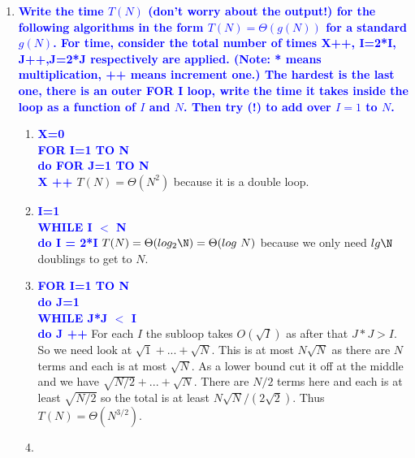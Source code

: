 \documentclass{article}
\begin{document}
\begin{enumerate}
\item \textbf{\textcolor{blue}{Write the time $T(N)$ (don't worry about the output!) for the following algorithms in the
form $T(N)=\Theta(g(N))$ for a standard $g(N)$.  
For time, consider the
total number of times X++, I=2*I, J++,J=2*J respectively are applied.
(Note: * means multiplication, ++ means increment one.)  The hardest is the last one,
there is an outer FOR I loop, write the time it takes inside the loop as a function of $I$ and $N$.
Then try (!) to add over $I=1$ to $N$.}}
    \begin{enumerate}
    \item \textbf{\textcolor{blue}{
    X=0
    \\ FOR I=1 TO N
    \\ \hspace*{1cm} do FOR J=1 TO N
    \\ \hspace*{2cm} X ++ }}
        \newline\newline $T(N)=\Theta(N^2)$ because it is a double loop.
    \item \textbf{\textcolor{blue}{
    I=1
    \\ WHILE I $<$ N
    \\ \hspace*{1cm} do I = 2*I}}
        \newline\newline $T(N)=\Theta(log_2\N)=\Theta(log\ N)$ because we 
		only need $lg\N$ doublings to get to $N$.
    \item \textbf{\textcolor{blue}{
    FOR I=1 TO N
    \\ \hspace*{1cm} do J=1
    \\ \hspace*{1cm} WHILE J*J $<$ I
    \\ \hspace*{2cm} do J ++}}
        \newline\newline 
		For each $I$ the subloop takes $O(\sqrt{I})$ as after that $J*J>I$.
		So we need look at $\sqrt{1}+...+\sqrt{N}$. 
		This is at most $N\sqrt{N}$ as there are $N$ terms and each is 
		at most $\sqrt{N}$.  As a lower bound cut it off at the middle and 
		we have $\sqrt{N/2} + ... + \sqrt{N}$. There are $N/2$ terms 
		here and each is at least $\sqrt{N/2}$ so the total is at 
		least $N\sqrt{N}/(2\sqrt{2})$. Thus $T(N)=\Theta(N^{3/2})$.
    \item \textbf{\textcolor{blue}{
}}
\end{enumerate}
\end{enumerate}
\end{document}
